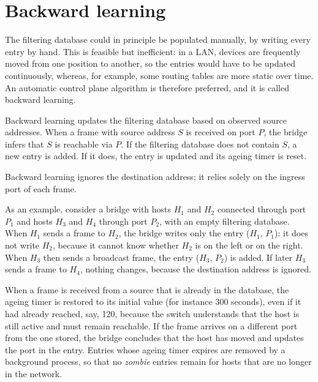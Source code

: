 \section{Backward learning}
The filtering database could in principle be populated manually, by writing every entry by hand. This is feasible but inefficient: in a LAN, devices are frequently moved from one position to another, so the entries would have to be updated continuously, whereas, for example, some routing tables are more static over time. An automatic control plane algorithm is therefore preferred, and it is called backward learning.

Backward learning updates the filtering database based on observed source addresses. When a frame with source address $S$ is received on port $P$, the bridge infers that $S$ is reachable via $P$. If the filtering database does not contain $S$, a new entry is added. If it does, the entry is updated and its ageing timer is reset.

\begin{center}
\end{center}

Backward learning ignores the destination address; it relies solely on the ingress port of each frame.

\begin{center}
\end{center}

As an example, consider a bridge with hosts $H_1$ and $H_2$ connected through port $P_1$ and hosts $H_3$ and $H_4$ through port $P_2$, with an empty filtering database. When $H_1$ sends a frame to $H_2$, the bridge writes only the entry ($H_1$, $P_1$): it does not write $H_2$, because it cannot know whether $H_2$ is on the left or on the right. When $H_3$ then sends a broadcast frame, the entry ($H_3$, $P_2$) is added. If later $H_3$ sends a frame to $H_4$, nothing changes, because the destination address is ignored.

When a frame is received from a source that is already in the database, the ageing timer is restored to its initial value (for instance 300 seconds), even if it had already reached, say, 120, because the switch understands that the host is still active and must remain reachable. If the frame arrives on a different port from the one stored, the bridge concludes that the host has moved and updates the port in the entry. Entries whose ageing timer expires are removed by a background process, so that no \emph{zombie} entries remain for hosts that are no longer in the network.

